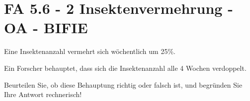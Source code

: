 \section{FA 5.6 - 2 Insektenvermehrung  - OA - BIFIE}

\begin{beispiel}[FA 5.6]{1} %
Eine Insektenanzahl vermehrt sich wöchentlich um 25\%.

Ein Forscher behauptet, dass sich die Insektenanzahl alle 4 Wochen verdoppelt. 

\leer

Beurteilen Sie, ob diese Behauptung richtig oder falsch ist, und begründen Sie Ihre Antwort rechnerisch! 




\end{beispiel}
